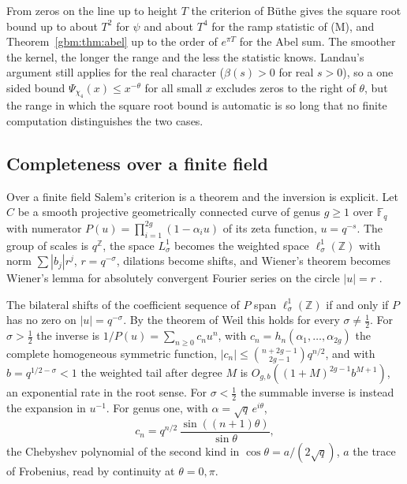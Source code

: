  From zeros on the line up to height $T$ the criterion of B\"uthe gives the square root bound up to about $T^2$ for $\psi$ and about $T^4$ for the ramp statistic of (M), and Theorem~\ref{gbm:thm:abel} up to the order of $e^{\pi T}$ for the Abel sum. The smoother the kernel, the longer the range and the less the statistic knows. Landau's argument still applies for the real character ($\beta(s)>0$ for real $s>0$), so a one sided bound $\Psi_{\chi_4}(x)\le x^{-\theta}$ for all small $x$ excludes zeros to the right of $\theta$, but the range in which the square root bound is automatic is so long that no finite computation distinguishes the two cases.

\subsection{Completeness over a finite field}

Over a finite field Salem's criterion is a theorem and the inversion is explicit. Let $C$ be a smooth projective geometrically connected curve of genus $g\ge1$ over $\mathbb F_q$ with numerator $P(u)=\prod_{i=1}^{2g}(1-\alpha_iu)$ of its zeta function, $u=q^{-s}$. The group of scales is $q^{\mathbb Z}$, the space $L^1_\sigma$ becomes the weighted space $\ell^1_\sigma(\mathbb Z)$ with norm $\sum|b_j|r^j$, $r=q^{-\sigma}$, dilations become shifts, and Wiener's theorem becomes Wiener's lemma for absolutely convergent Fourier series on the circle $|u|=r$ \cite{Wiener32}.

\begin{proposition}\label{gbm:prop:ff}
The bilateral shifts of the coefficient sequence of $P$ span $\ell^1_\sigma(\mathbb Z)$ if and only if $P$ has no zero on $|u|=q^{-\sigma}$. By the theorem of Weil \cite{Weil49} this holds for every $\sigma\ne\frac12$. For $\sigma>\frac12$ the inverse is $1/P(u)=\sum_{n\ge0}c_nu^n$, with $c_n=h_n(\alpha_1,\dots,\alpha_{2g})$ the complete homogeneous symmetric function, $|c_n|\le\binom{n+2g-1}{2g-1}q^{n/2}$, and with $b=q^{1/2-\sigma}<1$ the weighted tail after degree $M$ is $O_{g,b}((1+M)^{2g-1}b^{M+1})$, an exponential rate in the root sense. For $\sigma<\frac12$ the summable inverse is instead the expansion in $u^{-1}$. For genus one, with $\alpha=\sqrt q\,e^{i\theta}$,
\[
c_n=q^{n/2}\,\frac{\sin((n+1)\theta)}{\sin\theta},
\]
the Chebyshev polynomial of the second kind in $\cos\theta=a/(2\sqrt q)$, $a$ the trace of Frobenius, read by continuity at $\theta=0,\pi$.
\end{proposition}

